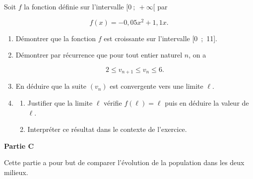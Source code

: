 \documentclass[10pt]{article}
\begin{document}
Soit $f$ la fonction définie sur l'intervalle $[0~;~+\infty[$ par 

\[f(x) = -0,05x^2 + 1,1x.\]

\begin{enumerate}[resume]
\item Démontrer que la fonction $f$ est croissante sur l'intervalle [0~;~11].
\item Démontrer par récurrence que pour tout entier naturel $n$, on a 

\[2 \leqslant v_{n+1} \leqslant v_n \leqslant 6.\]

\item En déduire que la suite $(v_n)$ est convergente vers une limite $\ell$.
\item 
	\begin{enumerate}
		\item Justifier que la limite $\ell$ vérifie $f(\ell) = \ell$ puis en déduire la valeur de $\ell$.
		\item Interpréter ce résultat dans le contexte de l'exercice.
	\end{enumerate}
\end{enumerate}

\medskip

\textbf{Partie C}

Cette partie a pour but de comparer l'évolution de la population dans les deux milieux.
\end{document}
